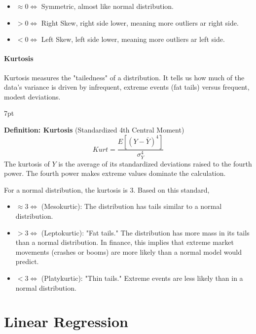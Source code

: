 \documentclass{article}
\newenvironment{greenblock}{%
\def\FrameCommand{%
  \hspace{1pt}%
    {\color{Green}%
    \vrule width 2pt}%
    {\color{greenshade}%
    \vrule width 4pt}%
  \colorbox{greenshade}%
}%
\MakeFramed{%
  \advance%
  \hsize-%
  \width%
  \FrameRestore}%
\noindent\hspace{-4.55pt}%
\begin{adjustwidth}{}{7pt}%
\vspace{2pt}\vspace{2pt}%
}
{%
\vspace{2pt}\end{adjustwidth}\endMakeFramed%
}
\begin{document}
\begin{itemize}
  \item $\approx 0 \iff $ Symmetric, almost like normal distribution.

  \item $>0 \iff $ Right Skew, right side lower, meaning more outliers ar right side.
  
  \item $<0 \iff $ Left Skew, left side lower, meaning more outliers ar left side.
\end{itemize}
  

\paragraph{Kurtosis}  


Kurtosis measures the "tailedness" of a distribution. It tells us how much of the data's variance is driven by infrequent, extreme events (fat tails) versus frequent, modest deviations.
\begin{greenblock}
\textbf{Definition: Kurtosis} (Standardized 4th Central Moment)
\begin{equation}
Kurt=\frac{E[(Y-\bar Y)^4]}{\sigma^4_Y}
\end{equation}
The kurtosis of $Y$ is the average of its standardized deviations raised to the fourth power. The fourth power makes extreme values dominate the calculation.
\end{greenblock}

For a normal distribution, the kurtosis is 3. Based on this standard,
\begin{itemize}
  \item $\approx 3 \iff$ (Mesokurtic): The distribution has tails similar to a normal distribution.
  \item $>3 \iff$ (Leptokurtic): "Fat tails." The distribution has more mass in its tails than a normal distribution. In finance, this implies that extreme market movements (crashes or booms) are more likely than a normal model would predict.
  
  \item $<3 \iff$ (Platykurtic): "Thin tails." Extreme events are less likely than in a normal distribution.
\end{itemize}


\section{Linear Regression}
\end{document}
